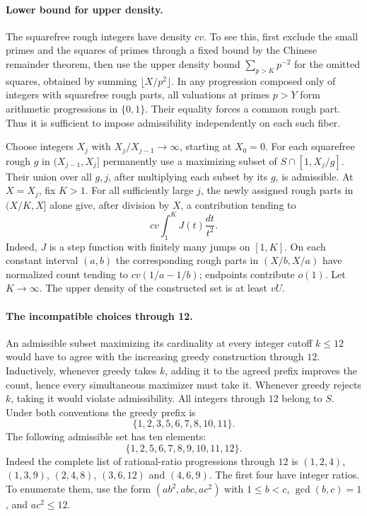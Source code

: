 \paragraph{Lower bound for upper density.}
The squarefree rough integers have density $cv$. To see this, first exclude the small primes and the squares of primes through a fixed bound by the Chinese remainder theorem, then use the upper density bound $\sum_{p>K}p^{-2}$ for the omitted squares, obtained by summing $\lfloor X/p^2\rfloor$. In any progression composed only of integers with squarefree rough parts, all valuations at primes $p>Y$ form arithmetic progressions in $\{0,1\}$. Their equality forces a common rough part. Thus it is sufficient to impose admissibility independently on each such fiber.

Choose integers $X_j$ with $X_j/X_{j-1}\to\infty$, starting at $X_0=0$. For each squarefree rough $g$ in $(X_{j-1},X_j]$ permanently use a maximizing subset of $S\cap[1,X_j/g]$. Their union over all $g,j$, after multiplying each subset by its $g$, is admissible. At $X=X_j$, fix $K>1$. For all sufficiently large $j$, the newly assigned rough parts in $(X/K,X]$ alone give, after division by $X$, a contribution tending to
\[
 cv\int_1^K J(t)\frac{dt}{t^2}.
\]
Indeed, $J$ is a step function with finitely many jumps on $[1,K]$. On each constant interval $(a,b)$ the corresponding rough parts in $(X/b,X/a)$ have normalized count tending to $cv(1/a-1/b)$; endpoints contribute $o(1)$. Let $K\to\infty$. The upper density of the constructed set is at least $vU$.

\paragraph{The incompatible choices through 12.}
An admissible subset maximizing its cardinality at every integer cutoff $k\le12$ would have to agree with the increasing greedy construction through $12$. Inductively, whenever greedy takes $k$, adding it to the agreed prefix improves the count, hence every simultaneous maximizer must take it. Whenever greedy rejects $k$, taking it would violate admissibility. All integers through $12$ belong to $S$. Under both conventions the greedy prefix is
\[
 \{1,2,3,5,6,7,8,10,11\}.
\]
The following admissible set has ten elements:
\[
 \{1,2,5,6,7,8,9,10,11,12\}.
\]
Indeed the complete list of rational-ratio progressions through $12$ is
$(1,2,4)$, $(1,3,9)$, $(2,4,8)$, $(3,6,12)$ and $(4,6,9)$. The first four have integer ratios. To enumerate them, use the form $(ab^2,abc,ac^2)$ with $1\le b<c$, $\gcd(b,c)=1$, and $ac^2\le12$.

